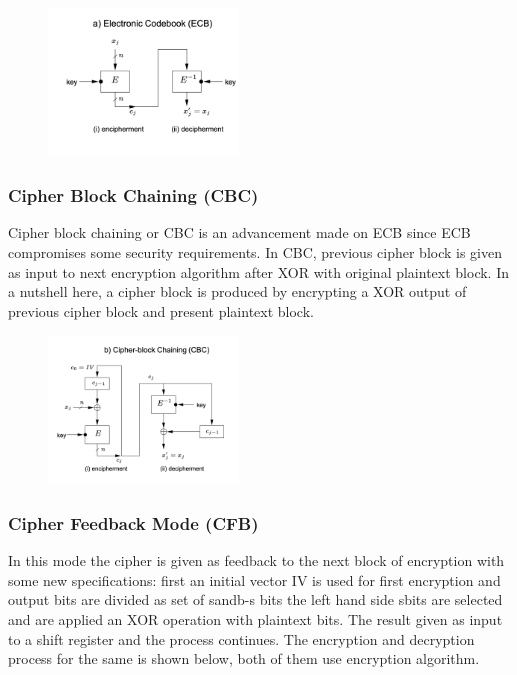 \documentclass[fleqn, journal, onecolumn]{IEEEtran}             %
\theoremstyle{break}                                            %
\begin{document}
        \begin{figure}[!htbp] 
          \includegraphics[width=0.45\textwidth]{ECB}
          \caption{\cite{Meneces}}
        \end{figure}

        \vfill

        \subsubsection{Cipher Block Chaining (CBC)}
      
        Cipher block chaining or CBC is an advancement made on ECB since 
        ECB compromises some security requirements. In CBC, previous cipher block is
        given as input to next encryption algorithm after XOR with original plaintext block. 
        In a nutshell here, a cipher block is produced by encrypting a XOR output of previous
        cipher block and present plaintext block. 

        \begin{figure}[!htbp] 
          \includegraphics[width=0.45\textwidth]{CBC}
          \caption{\cite{Meneces}}
        \end{figure}

      \subsubsection{Cipher Feedback Mode (CFB)}
      
        In this mode the cipher is given as feedback to the next block of encryption with some new specifications: 
        first an initial vector IV is used for first encryption and output bits are divided as set of sandb-s bits
        the left hand side sbits are selected and are applied an XOR operation with plaintext bits. The result given
        as input to a shift register and the process continues. The encryption and decryption process for the same
        is shown below, both of them use encryption algorithm.
\end{document}
